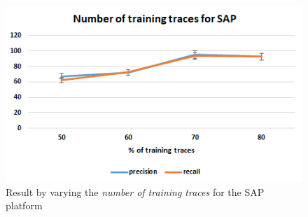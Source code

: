 \begin{itemize}
\begin{figure}[ht]
    \centering
    \includegraphics[scale=0.65,keepaspectratio = true]{Graphics/SAP_traces.png}
    \caption{Result by varying the \textit{number of training traces} for the SAP platform}
    \label{fig:SAP_traces}
\end{figure}

\end{itemize}

\endinput
=====================================================================
